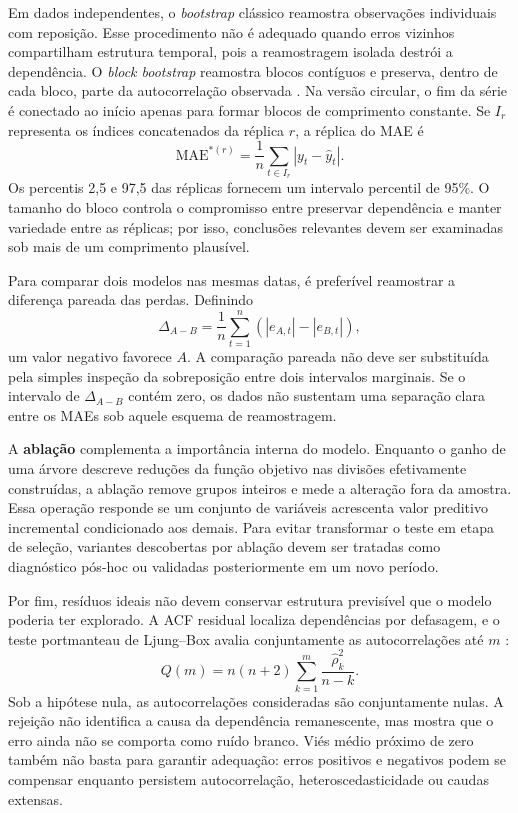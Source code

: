 Em dados independentes, o \textit{bootstrap} clássico reamostra observações individuais com reposição. Esse procedimento não é adequado quando erros vizinhos compartilham estrutura temporal, pois a reamostragem isolada destrói a dependência. O \textit{block bootstrap} reamostra blocos contíguos e preserva, dentro de cada bloco, parte da autocorrelação observada \cite{lahiri2003resampling}. Na versão circular, o fim da série é conectado ao início apenas para formar blocos de comprimento constante. Se $I_r$ representa os índices concatenados da réplica $r$, a réplica do MAE é
\begin{equation}
    \mathrm{MAE}^{*(r)}
    =\frac{1}{n}\sum_{t\in I_r}|y_t-\widehat y_t|.
\end{equation}
Os percentis 2,5 e 97,5 das réplicas fornecem um intervalo percentil de 95\%. O tamanho do bloco controla o compromisso entre preservar dependência e manter variedade entre as réplicas; por isso, conclusões relevantes devem ser examinadas sob mais de um comprimento plausível.

Para comparar dois modelos nas mesmas datas, é preferível reamostrar a diferença pareada das perdas. Definindo
\begin{equation}
    \Delta_{A-B}=\frac{1}{n}\sum_{t=1}^{n}
    \left(|e_{A,t}|-|e_{B,t}|\right),
    \label{eq:delta_mae_pareado}
\end{equation}
um valor negativo favorece $A$. A comparação pareada não deve ser substituída pela simples inspeção da sobreposição entre dois intervalos marginais. Se o intervalo de $\Delta_{A-B}$ contém zero, os dados não sustentam uma separação clara entre os MAEs sob aquele esquema de reamostragem.

A \textbf{ablação} complementa a importância interna do modelo. Enquanto o ganho de uma árvore descreve reduções da função objetivo nas divisões efetivamente construídas, a ablação remove grupos inteiros e mede a alteração fora da amostra. Essa operação responde se um conjunto de variáveis acrescenta valor preditivo incremental condicionado aos demais. Para evitar transformar o teste em etapa de seleção, variantes descobertas por ablação devem ser tratadas como diagnóstico pós-hoc ou validadas posteriormente em um novo período.

Por fim, resíduos ideais não devem conservar estrutura previsível que o modelo poderia ter explorado. A ACF residual localiza dependências por defasagem, e o teste portmanteau de Ljung--Box avalia conjuntamente as autocorrelações até $m$ \cite{ljung1978measure}:
\begin{equation}
    Q(m)=n(n+2)\sum_{k=1}^{m}\frac{\widehat\rho_k^2}{n-k}.
    \label{eq:ljung_box}
\end{equation}
Sob a hipótese nula, as autocorrelações consideradas são conjuntamente nulas. A rejeição não identifica a causa da dependência remanescente, mas mostra que o erro ainda não se comporta como ruído branco. Viés médio próximo de zero também não basta para garantir adequação: erros positivos e negativos podem se compensar enquanto persistem autocorrelação, heteroscedasticidade ou caudas extensas.

